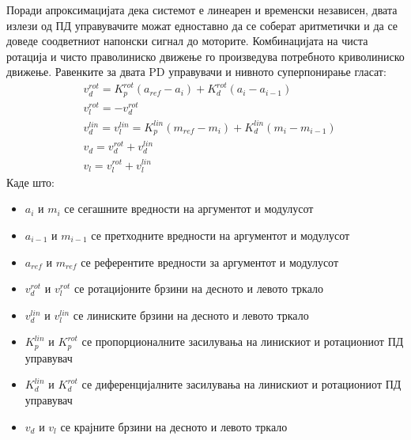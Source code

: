 \documentclass[11pt]{article}
\begin{document}
      Поради апроксимацијата дека системот е линеарен и временски независен, двата излези од ПД управувачите можат едноставно да се соберат аритметички и да се доведе соодветниот напонски сигнал до моторите. Комбинацијата на чиста ротација и чисто праволиниско движење го произведува потребното криволиниско движење. Равенките за двата PD управувачи и нивното суперпонирање гласат:
      \begin{align}
        & v_d^{rot} = K_p^{rot}(a_{ref} - a_i) + K_d^{rot}(a_i - a_{i-1}) \nonumber\\
        & v_l^{rot} = -v_d^{rot} \nonumber\\
        & v_d^{lin} = v_l^{lin} = K_p^{lin}(m_{ref} - m_i) + K_d^{lin}(m_i - m_{i-1}) \\
        & v_d = v_d^{rot} + v_d^{lin} \nonumber \\
        & v_l = v_l^{rot} + v_l^{lin} \nonumber
      \end{align}
      Каде што:
      \begin{itemize}
        \item $a_i$ и $m_i$ се сегашните вредности на аргументот и модулусот
        \item $a_{i-1}$ и $m_{i-1}$ се претходните вредности на аргументот и модулусот
        \item $a_{ref}$ и $m_{ref}$ се референтите вредности за аргументот и модулусот
        \item $v_d^{rot}$ и $v_l^{rot}$ се ротацијоните брзини на десното и левото тркало
        \item $v_d^{lin}$ и $v_l^{lin}$ се линиските брзини на десното и левото тркало
        \item $K_p^{lin}$ и $K_p^{rot}$ се пропорционалните засилувања на линискиот и ротациониот ПД управувач
        \item $K_d^{lin}$ и $K_d^{rot}$ се диференцијалните засилувања на линискиот и ротациониот ПД управувач
        \item $v_d$ и $v_l$ се крајните брзини на десното и левото тркало
      \end{itemize}

\end{document}
